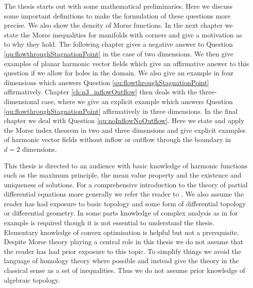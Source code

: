 The thesis starts out with some mathematical preliminaries.
Here we discuss some important definitions to make the formulation of these
questions more precise.
We also show the density of Morse functions.
In the next chapter we state the Morse inequalities for manifolds with corners and give a motivation as to why they hold.
The following chapter gives a negative answer to Question \ref{qu:flowthroughStagnationPoint} in the case of two dimensions.
We then give examples of planar
harmonic vector fields which give an affirmative answer to this question if we allow for holes in the domain. We also give an example in four dimensions which answers Question \ref{qu:flowthroughStagnationPoint} affirmatively.
Chapter \ref{ch:n3_inflowOutflow} then deals with the three-dimensional case, where we give an explicit example which answers Question \ref{qu:flowthroughStagnationPoint}
affirmatively in three dimensions.
In the final chapter we deal with Question \ref{qu:noInflowNoOutflow}.
Here we state and apply the Morse index theorem in two and three dimensions and give explicit examples of harmonic vector fields without inflow or outflow through the boundary in $d=2$ dimensions.

This thesis is directed to an audience with basic knowledge of harmonic functions such
as the maximum principle, the mean value property and the existence and uniqueness of solutions.
For a comprehensive introduction to the
theory of partial differential equations more generally we refer the reader to \cite{Evans2010}.
We also assume the reader has had exposure to basic topology and some form of differential topology or
differential geometry. 
In some parts knowledge of complex analysis as in for example \cite{Gamelin2001} is required though it is not 
essential to understand the thesis.
Elementary knowledge of convex optimisation is helpful but not a prerequisite.
Despite Morse theory playing a central role in this thesis we do not assume that the reader has had
prior exposure to this topic. To simplify things we avoid the language of homology
theory where possible and instead give the theory in the classical sense as a set of inequalities.
Thus we do not assume prior knowledge of algebraic topology.

